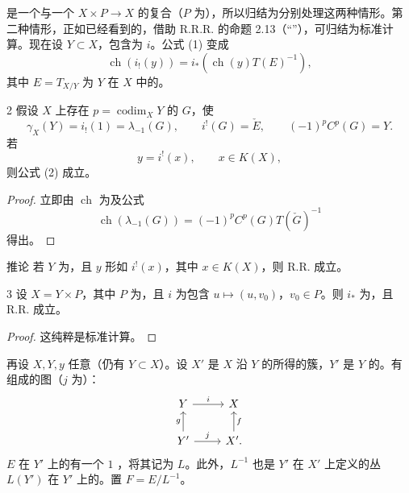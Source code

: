 是一个与一个 $X\times P\to X$ 的复合（$P$ 为），所以归结为分别处理这两种情形。第二种情形，正如已经看到的，借助 R.R.R. 的命题 2.13（“”），可归结为标准计算。现在设 $Y\subset X$，包含为 $i$。公式 (1) 变成
\[
\operatorname{ch}(i_!(y))=i_*(\operatorname{ch}(y)T(E)^{-1}),\tag{2}
\]
其中 $E=T_{X/Y}$ 为 $Y$ 在 $X$ 中的。
\begin{SGAresult}{}{2}
假设 $X$ 上存在 $p=\operatorname{codim}_X Y$ 的 $G$，使
\[
\gamma_X(Y)=i_!(1)=\lambda_{-1}(G),\qquad i^!(G)=\check E,\qquad(-1)^pC^p(G)=Y.\tag{3}
\]
若
\[
y=i^!(x),\qquad x\in K(X),\tag{4}
\]
则公式 (2) 成立。
\end{SGAresult}
\begin{proof}
立即由 $\operatorname{ch}$ 为及公式
\[
\operatorname{ch}(\lambda_{-1}(G))=(-1)^pC^p(G)T(\check G)^{-1}\tag{5}
\]
得出。
\end{proof}
\begin{SGAresult}{推论}{}
若 $Y$ 为，且 $y$ 形如 $i^!(x)$，其中 $x\in K(X)$，则 R.R. 成立。
\end{SGAresult}
\begin{SGAresult}{}{3}
设 $X=Y\times P$，其中 $P$ 为，且 $i$ 为包含 $u\mapsto(u,v_0)$，$v_0\in P$。则 $i_*$ 为，且 R.R. 成立。
\end{SGAresult}
\begin{proof}这纯粹是标准计算。\end{proof}

再设 $X,Y,y$ 任意（仍有 $Y\subset X$）。设 $X'$ 是 $X$ 沿 $Y$ 的所得的簇，$Y'$ 是 $Y$ 的。有组成的图（$j$ 为）：
\[
\begin{tikzcd}
Y\arrow[r,"i"]&X\\
Y'\arrow[u,"g"]\arrow[r,"j"]&X'\arrow[u,"f"'].
\end{tikzcd}
\]
$E$ 在 $Y'$ 上的有一个 $1$ ，将其记为 $L$。此外，$L^{-1}$ 也是 $Y'$ 在 $X'$ 上定义的丛 $L(Y')$ 在 $Y'$ 上的。置 $F=E/L^{-1}$。

